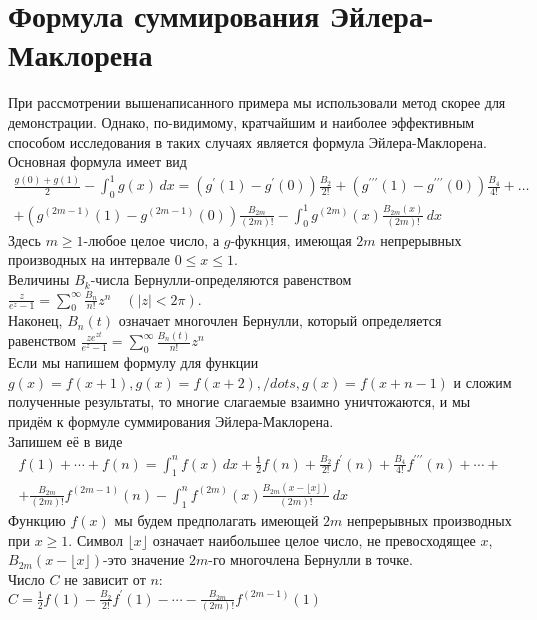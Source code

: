 \documentclass{report}
\begin{document}
\section{Формула суммирования Эйлера-Маклорена}
При рассмотрении вышенаписанного примера мы использовали метод скорее для демонстрации. Однако, по-видимому, кратчайшим и наиболее эффективным способом исследования в таких случаях является формула Эйлера-Маклорена. \\
Основная формула имеет вид \\
\begin{multline}
\frac{g(0)+g(1)}{2}-\int_{0}^{1}g(x)\,dx=(g^{\prime}(1)-g^{\prime}(0))\frac{B_2}{2!}+(g^{\prime\prime\prime}(1)-g^{\prime\prime\prime}(0))\frac{B_4}{4!}+\dots \\
+(g^{(2m-1)}(1)-g^{(2m-1)}(0))\frac{B_{2m}}{(2m)!}-\int_{0}^{1}g^{(2m)}(x)\frac{B_{2m}(x)}{(2m)!}\,dx
\end{multline}
Здесь $m\geq{1}$-любое целое число, а $g$-фукнция, имеющая $2m$ непрерывных производных на интервале $0\le{x}\le{1}$. \\
Величины $B_k$-числа Бернулли-определяются равенством $\frac{z}{e^z-1}=\sum_{0}^{\infty}\frac{B_n}{n!}z^n\quad(|z|<2\pi)$. \\
Наконец, $B_n(t)$ означает многочлен Бернулли, который определяется равенством $\frac{ze^{zt}}{e^z-1}=\sum_{0}^{\infty}\frac{B_n(t)}{n!}z^n$ \\
Если мы напишем формулу для функции $g(x)=f(x+1),g(x)=f(x+2),/dots,g(x)=f(x+n-1)$ и сложим полученные результаты, то многие слагаемые взаимно уничтожаются, и мы придём к формуле суммирования Эйлера-Маклорена. \\
Запишем её в виде \\
\begin{multline}
f(1)+\cdots+f(n)=\int_{1}^{n}f(x)\,dx+\frac{1}{2}f(n)+\frac{B_2}{2!}f^{\prime}(n)+\frac{B_4}{4!}f^{\prime\prime\prime}(n)+\cdots+\\
+\frac{B_{2m}}{(2m)!}f^{(2m-1)}(n)-\int_{1}^{n}f^{(2m)}(x)\frac{B_{2m}(x-\lfloor{x}\rfloor)}{(2m)!}\,dx
\end{multline}
Функцию $f(x)$ мы будем предполагать имеющей $2m$ непрерывных производных при $x\geq{1}$. Символ $\lfloor{x}\rfloor$ означает наибольшее целое число, не превосходящее $x$,
$B_{2m}(x-\lfloor{x}\rfloor)$-это значение $2m$-го многочлена Бернулли в точке. \\
Число $C$ не зависит от $n$: \\
$C=\frac{1}{2}f(1)-\frac{B_2}{2!}f^{\prime}(1)-\cdots-\frac{B_{2m}}{(2m)!}f^{(2m-1)}(1)$ \\
\end{document}
